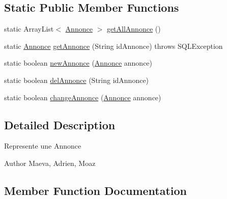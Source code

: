 \subsection*{Static Public Member Functions}
\begin{DoxyCompactItemize}
\item 
static Array\+List$<$ \hyperlink{classcom_1_1ecetech_1_1bti4_1_1itproject_1_1classified_1_1beans_1_1_annonce}{Annonce} $>$ \hyperlink{classcom_1_1ecetech_1_1bti4_1_1itproject_1_1classified_1_1dao_1_1_annonce_d_a_o_a43c4df5f208c931332cb925dc1d0214b}{get\+All\+Annonce} ()
\item 
static \hyperlink{classcom_1_1ecetech_1_1bti4_1_1itproject_1_1classified_1_1beans_1_1_annonce}{Annonce} \hyperlink{classcom_1_1ecetech_1_1bti4_1_1itproject_1_1classified_1_1dao_1_1_annonce_d_a_o_a72ad95094dc897fd58458aedf68fba7f}{get\+Annonce} (String id\+Annonce)  throws S\+Q\+L\+Exception 
\item 
static boolean \hyperlink{classcom_1_1ecetech_1_1bti4_1_1itproject_1_1classified_1_1dao_1_1_annonce_d_a_o_aab92a2bd9bb1c898f4f86c702b8e9513}{new\+Annonce} (\hyperlink{classcom_1_1ecetech_1_1bti4_1_1itproject_1_1classified_1_1beans_1_1_annonce}{Annonce} annonce)
\item 
static boolean \hyperlink{classcom_1_1ecetech_1_1bti4_1_1itproject_1_1classified_1_1dao_1_1_annonce_d_a_o_a3aa4c426e9f0faf21c617de92d57a7a4}{del\+Annonce} (String id\+Annonce)
\item 
static boolean \hyperlink{classcom_1_1ecetech_1_1bti4_1_1itproject_1_1classified_1_1dao_1_1_annonce_d_a_o_a8e467f67071507e30e8811c1e52f7331}{change\+Annonce} (\hyperlink{classcom_1_1ecetech_1_1bti4_1_1itproject_1_1classified_1_1beans_1_1_annonce}{Annonce} annonce)
\end{DoxyCompactItemize}


\subsection{Detailed Description}
Represente une Annonce \begin{DoxyAuthor}{Author}
Maeva, Adrien, Moaz 
\end{DoxyAuthor}


\subsection{Member Function Documentation}
